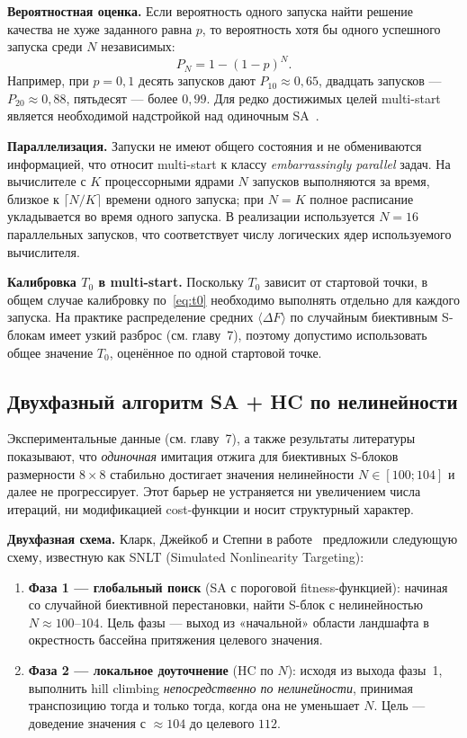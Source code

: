 \textbf{Вероятностная оценка.} Если вероятность одного запуска
найти решение качества не хуже заданного равна $p$, то
вероятность хотя бы одного успешного запуска среди $N$
независимых:
\begin{equation}
\label{eq:multistart}
    P_N = 1 - (1 - p)^N.
\end{equation}
Например, при $p = 0{,}1$ десять запусков дают $P_{10} \approx 0{,}65$,
двадцать запусков — $P_{20} \approx 0{,}88$, пятьдесят — более
$0{,}99$. Для редко достижимых целей multi-start является
необходимой надстройкой над одиночным SA~\cite{marti2013multistart}.

\textbf{Параллелизация.} Запуски не имеют общего состояния и не
обмениваются информацией, что относит multi-start к классу
\emph{embarrassingly parallel} задач. На вычислителе с $K$
процессорными ядрами $N$ запусков выполняются за время, близкое
к $\lceil N/K \rceil$ времени одного запуска; при $N = K$ полное
расписание укладывается во время одного запуска. В реализации
используется $N = 16$ параллельных запусков, что соответствует
числу логических ядер используемого вычислителя.

\textbf{Калибровка $T_0$ в multi-start.} Поскольку $T_0$ зависит
от стартовой точки, в общем случае калибровку
по~\eqref{eq:t0} необходимо выполнять отдельно для каждого
запуска. На практике распределение средних $\langle\Delta F\rangle$
по случайным биективным S-блокам имеет узкий разброс (см. главу~7),
поэтому допустимо использовать общее значение $T_0$, оценённое
по одной стартовой точке.

\subsection{Двухфазный алгоритм SA + HC по нелинейности}

Экспериментальные данные (см. главу~7), а также результаты
литературы~\cite{clark2005sboxes,mdpi2022sboxes} показывают, что
\emph{одиночная} имитация отжига для биективных S-блоков
размерности $8 \times 8$ стабильно достигает значения нелинейности
$N \in [100; 104]$ и далее не прогрессирует. Этот барьер не
устраняется ни увеличением числа итераций, ни модификацией
cost-функции и носит структурный характер.

\textbf{Двухфазная схема.} Кларк, Джейкоб и Степни в работе~\cite{clark2005sboxes}
предложили следующую схему, известную как
SNLT (Simulated Nonlinearity Targeting):
\begin{enumerate}
    \item \textbf{Фаза 1 — глобальный поиск} (SA с пороговой
        fitness-функцией): начиная со случайной биективной
        перестановки, найти S-блок с нелинейностью $N \approx 100$–$104$.
        Цель фазы — выход из «начальной» области ландшафта в окрестность
        бассейна притяжения целевого значения.
    \item \textbf{Фаза 2 — локальное доуточнение} (HC по $N$):
        исходя из выхода фазы~1, выполнить hill climbing
        \emph{непосредственно по нелинейности}, принимая
        транспозицию тогда и только тогда, когда она не уменьшает
        $N$. Цель — доведение значения с $\approx 104$ до целевого
        $112$.
\end{enumerate}

